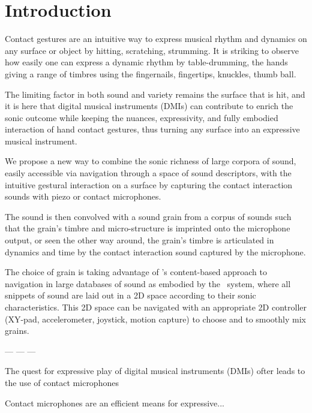\section{Introduction}


Contact gestures are an intuitive way to express musical rhythm and dynamics on any surface or object by hitting, scratching, strumming.  It is striking to observe how easily one can express a dynamic rhythm by table-drumming, the hands giving a range of timbres using the fingernails, fingertips, knuckles, thumb ball.


The limiting factor in both sound and variety remains the surface that is hit, and it is here that digital musical instruments (DMIs) can contribute to enrich the sonic outcome while keeping the nuances, expressivity, and fully embodied interaction of hand contact gestures, thus turning any surface into an expressive musical instrument.


We propose a new way to combine the sonic richness of large corpora of sound, easily accessible via navigation through a space of sound descriptors, with the intuitive gestural interaction on a surface by capturing the contact interaction sounds with piezo or contact microphones.


The sound is then convolved with a sound grain from a corpus of sounds such that the grain's timbre and micro-structure is imprinted onto the microphone output, or seen the other way around, the grain's timbre is articulated in dynamics and time by the contact interaction sound captured by the microphone.


The choice of grain is taking advantage of \cbcs's content-based approach to navigation in large databases of sound as embodied by the \catart\ system, where all snippets of sound are laid out in a 2D space according to their sonic characteristics.  This 2D space can be navigated with an appropriate 2D controller (XY-pad, accelerometer, joystick, motion capture) to choose and to smoothly mix grains.


--- --- ---


The quest for expressive play of digital musical instruments (DMIs) ofter leads to the use of contact microphones


Contact microphones are an efficient means for expressive...
